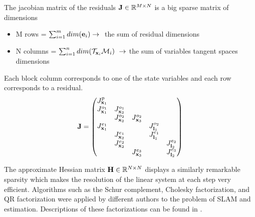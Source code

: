 The jacobian matrix of the residuals ${\bf J} \in \mathbb{R}^{M \times N}$ is a big sparse matrix of dimensions 
\begin{itemize}
    \item M rows = $\sum_{i=1}^{m}dim({\bf e}_i) \rightarrow~$ the sum of residual dimensions
    \item N columns = $\sum_{i=1}^{n}dim(\mathcal{T}_{{\bf x}_i}\mathcal{M}_i)~\rightarrow$ the sum of variables tangent spaces dimensions 
\end{itemize}   

Each block column corresponds to one of the state variables and each row corresponds to a residual.
\begin{equation}
    {\bf J}=
    \begin{pmatrix}
        J^{p}_{{\bf x}_1} &   &     &     &     \\
       J^{o_1}_{{\bf x}_1} & J^{o_1}_{{\bf x}_2}  &     &     &     \\
                       & J^{o_2}_{{\bf x}_2}  & J^{o_2}_{{\bf x}_3}   &     &     \\
       J^{e_1}_{{\bf x}_1} &                  &     &  J^{o_2}_{{\bf l}_1}   &     \\
                       & J^{e_1}_{{\bf x}_2}  &     &  J^{e_1}_{{\bf l}_1}   &     \\
                       & J^{e_2}_{{\bf x}_2}  &     &     &  J^{e_2}_{{\bf l}_2}   \\
                       &                  & J^{e_3}_{{\bf x}_3}    &     &  J^{e_3}_{{\bf l}_2}   \\
    \end{pmatrix}
    \label{eq:sparse_jac}
\end{equation}

The approximate Hessian matrix ${\bf H} \in \mathbb{R}^{N \times N}$ displays a similarly remarkable sparsity which makes the resolution of the linear system
at each step very efficient. Algorithms such as the Schur complement, Cholesky factorization, and QR factorization were applied by different authors to the 
problem of SLAM and estimation. Descriptions of these factorizations can be found in \cite{sola2017course, dellaert2017factor}.







